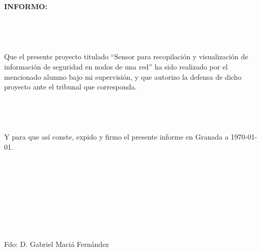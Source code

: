 \documentclass{article}
\begin{document}
\\
\\
\\
\\
\\
\\
\\
\\
\\
\quad \quad \textbf{INFORMO:}
\\
\\
\\
\\
\\
Que el presente proyecto titulado ``Sensor para recopilación y visualización de información de seguridad en nodos de una red'' ha sido realizado por el mencionado alumno bajo mi supervisión, y que autorizo la defensa de dicho proyecto ante el tribunal que corresponda.\\
\\
\\
\\
\\
Y para que así conste, expido y firmo el presente informe en Granada a \today.
\\
\\
\\
\\
\\
\\
\\
\\
\\
\begin{center}Fdo: D. Gabriel Maciá Fernández \end{center}
\end{document}
